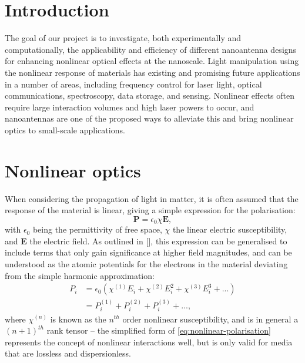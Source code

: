 \documentclass[12pt,a4paper]{article}
\newcommand{\citein}[1]{[\citen{#1}]}
\begin{document}
\section{Introduction}
The goal of our project is to investigate, both experimentally and computationally, the applicability and efficiency of different nanoantenna designs for enhancing nonlinear optical effects at the nanoscale. Light manipulation using the nonlinear response of materials has existing and promising future applications in a number of areas, including frequency control for laser light, optical communications, spectroscopy, data storage, and sensing\cite{garmireNonlinearOpticsDaily2013a}. Nonlinear effects often require large interaction volumes and high laser powers to occur, and nanoantennas are one of the proposed ways to alleviate this and bring nonlinear optics to small-scale applications.

\section{Nonlinear optics}
\label{section:nonlinear-optics}
When considering the propagation of light in matter, it is often assumed that the response of the material is linear\cite{jacksonClassicalElectrodynamics1999}, giving a simple expression for the polarisation:
\begin{equation}
	\label{eq:linear-polarisation}
	\bm{P}=\epsilon_0\chi\bm{E},
\end{equation}
with $\epsilon_0$ being the permittivity of free space, $\chi$ the linear electric susceptibility, and $\bm{E}$ the electric field. As outlined in \citein{boydNonlinearOptics2008}, this expression can be generalised to include terms that only gain significance at higher field magnitudes, and can be understood as the atomic potentials for the electrons in the material deviating from the simple harmonic approximation:
\begin{equation}
\begin{aligned}
	\label{eq:nonlinear-polarisation}
	P_i&=\epsilon_0(\chi^{(1)}E_i+\chi^{(2)}E_i^2+\chi^{(3)}E_i^3+...)\\
	&=P_i^{(1)}+P_i^{(2)}+P_i^{(3)}+...,
\end{aligned}
\end{equation}
where $\chi^{(n)}$ is known as the $n^{th}$ order nonlinear susceptibility, and is in general a $(n+1)^{th}$ rank tensor -- the simplified form of \eqref{eq:nonlinear-polarisation} represents the concept of nonlinear interactions well, but is only valid for media that are lossless and dispersionless.
\end{document}
